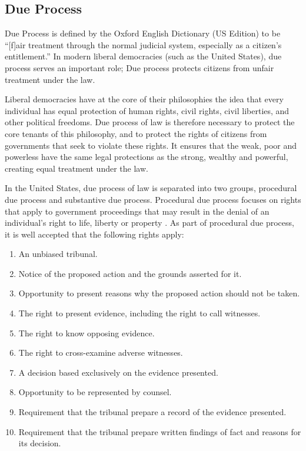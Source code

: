 \documentclass[12pt]{article} %
\newcommand{\hlfixme}[1]{\fxfatal{\hl{#1}}}
\begin{document}
\subsection{Due Process} \label{subsec:dueprocess}
Due Process is defined by the Oxford English Dictionary (US Edition) to be ``[f]air treatment through the normal judicial system, especially as a citizen’s entitlement.'' In modern liberal democracies (such as the United States), due process serves an important role; Due process protects citizens from unfair treatment under the law. 

Liberal democracies have at the core of their philosophies the idea that every individual has equal protection of human rights, civil rights, civil liberties, and other political freedoms. Due process of law is therefore necessary to protect the core tenants of this philosophy, and to protect the rights of citizens from governments that seek to violate these rights. It ensures that the weak, poor and powerless have the same legal protections as the strong, wealthy and powerful, creating equal treatment under the law.

In the United States, due process of law is separated into two groups, procedural due process and substantive due process. Procedural due process focuses on rights that apply to government proceedings that may result in the denial of an individual's right to life, liberty or property \cite{wex_procedural}. As part of procedural due process, it is well accepted that the following rights apply: \cite{friendly}

\begin{enumerate}
\item An unbiased tribunal.
\item Notice of the proposed action and the grounds asserted for it.
\item Opportunity to present reasons why the proposed action should not be taken.
\item The right to present evidence, including the right to call witnesses.
\item The right to know opposing evidence.
\item The right to cross-examine adverse witnesses.
\item A decision based exclusively on the evidence presented.
\item Opportunity to be represented by counsel.
\item Requirement that the tribunal prepare a record of the evidence presented.
\item Requirement that the tribunal prepare written findings of fact and reasons for its decision.
\end{enumerate}
\end{document}
